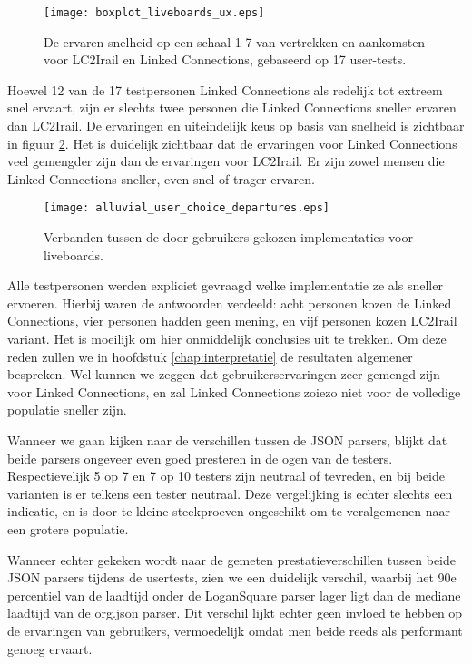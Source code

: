\begin{figure}[h]
	\centering
	\texttt{[image: boxplot\_liveboards\_ux.eps]}
	\caption[Ervaren snelheid van liveboards]{De ervaren snelheid op een schaal 1-7 van vertrekken en aankomsten voor LC2Irail en Linked Connections, gebaseerd op 17 user-tests.}
	\label{fig:liveboardsUx}
\end{figure}

Hoewel 12 van de 17 testpersonen Linked Connections als redelijk tot extreem snel ervaart, zijn er slechts twee personen die Linked Connections sneller ervaren dan LC2Irail. De ervaringen en uiteindelijk keus op basis van snelheid is zichtbaar in figuur \ref{fig:alluvialUserChoicesLiveboards}. Het is duidelijk zichtbaar dat de ervaringen voor Linked Connections veel gemengder zijn dan de ervaringen voor LC2Irail. Er zijn zowel mensen die Linked Connections sneller, even snel of trager ervaren. 

\begin{figure}[ht]
	\centering
	\texttt{[image: alluvial\_user\_choice\_departures.eps]}
	\caption[Door gebruikers gekozen implementatie voor liveboards]{Verbanden tussen de door gebruikers gekozen implementaties voor liveboards. }
	\label{fig:alluvialUserChoicesLiveboards}
\end{figure}

Alle testpersonen werden expliciet gevraagd welke implementatie ze als sneller ervoeren. Hierbij waren de antwoorden verdeeld: acht personen kozen de Linked Connections, vier personen hadden geen mening, en vijf personen kozen LC2Irail variant. Het is moeilijk om hier onmiddelijk conclusies uit te trekken. Om deze reden zullen we in hoofdstuk \ref{chap:interpretatie} de resultaten algemener bespreken. Wel kunnen we zeggen dat gebruikerservaringen zeer gemengd zijn voor Linked Connections, en zal Linked Connections zoiezo niet voor de volledige populatie sneller zijn.

Wanneer we gaan kijken naar de verschillen tussen de JSON parsers, blijkt dat beide parsers ongeveer even goed presteren in de ogen van de testers. Respectievelijk 5 op 7 en 7 op 10 testers zijn neutraal of tevreden, en bij beide varianten is er telkens een tester neutraal. Deze vergelijking is echter slechts een indicatie, en is door te kleine steekproeven ongeschikt om te veralgemenen naar een grotere populatie.

Wanneer echter gekeken wordt naar de gemeten prestatieverschillen tussen beide JSON parsers tijdens de usertests, zien we een duidelijk verschil, waarbij het 90e percentiel van de laadtijd onder de LoganSquare parser lager ligt dan de mediane laadtijd van de org.json parser. Dit verschil lijkt echter geen invloed te hebben op de ervaringen van gebruikers, vermoedelijk omdat men beide reeds als performant genoeg ervaart. %

